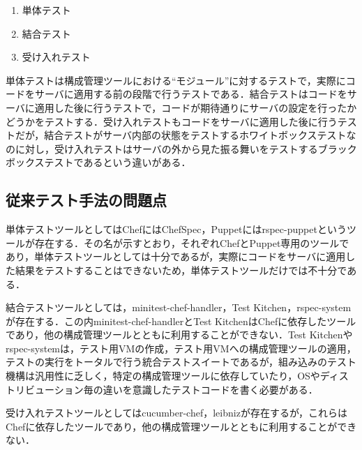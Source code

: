 \begin{enumerate}
  \item 単体テスト
  \item 結合テスト
  \item 受け入れテスト
\end{enumerate}

単体テストは構成管理ツールにおける``モジュール''に対するテストで，実際にコードをサーバに適用する前の段階で行うテストである．結合テストはコードをサーバに適用した後に行うテストで，コードが期待通りにサーバの設定を行ったかどうかをテストする．受け入れテストもコードをサーバに適用した後に行うテストだが，結合テストがサーバ内部の状態をテストするホワイトボックステストなのに対し，受け入れテストはサーバの外から見た振る舞いをテストするブラックボックステストであるという違いがある．

\subsection{従来テスト手法の問題点}

単体テストツールとしてはChefにはChefSpec，Puppetにはrspec-puppetというツールが存在する．その名が示すとおり，それぞれChefとPuppet専用のツールであり，単体テストツールとしては十分であるが，実際にコードをサーバに適用した結果をテストすることはできないため，単体テストツールだけでは不十分である．

結合テストツールとしては，minitest-chef-handler，Test Kitchen，rspec-systemが存在する．この内minitest-chef-handlerとTest KitchenはChefに依存したツールであり，他の構成管理ツールとともに利用することができない．Test Kitchenやrspec-systemは，テスト用VMの作成，テスト用VMへの構成管理ツールの適用，テストの実行をトータルで行う統合テストスイートであるが，組み込みのテスト機構は汎用性に乏しく，特定の構成管理ツールに依存していたり，OSやディストリビューション毎の違いを意識したテストコードを書く必要がある．

受け入れテストツールとしてはcucumber-chef，leibnizが存在するが，これらはChefに依存したツールであり，他の構成管理ツールとともに利用することができない．
